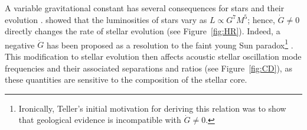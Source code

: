 \documentclass[twocolumn]{aastex63}
\begin{document}
A variable gravitational constant has several consequences for stars and their evolution \citep[e.g.,][]{1977A&A....56..359M}. 
\citet{PhysRev.73.801} showed that the luminosities of stars vary as $L \propto G^7 M^5$; hence, ${\dot G \neq 0}$ directly changes the rate of stellar evolution (see Figure~\ref{fig:HR}). 
Indeed, a negative $\dot G$ has been proposed as a resolution to the faint young Sun paradox\footnote{Ironically, Teller's initial motivation for deriving this relation was to show that geological evidence is incompatible with $\dot G \neq 0$.} \citep{2014IJMPD..2342018S}. 
This modification to stellar evolution then affects acoustic stellar oscillation mode frequencies and their associated separations and ratios (see Figure~\ref{fig:CD}), as these quantities are sensitive to the composition of the stellar core. 
\end{document}
